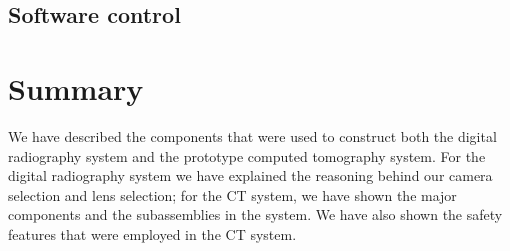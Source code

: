 \subsection{Software control}


\section{Summary}
We have described the components that were used to construct both the digital radiography system and the prototype computed tomography system.  For the digital radiography system we have explained the reasoning behind our camera selection and lens selection; for the CT system, we have shown the major components and the subassemblies in the system.  We have also shown the safety features that were employed in the CT system.  